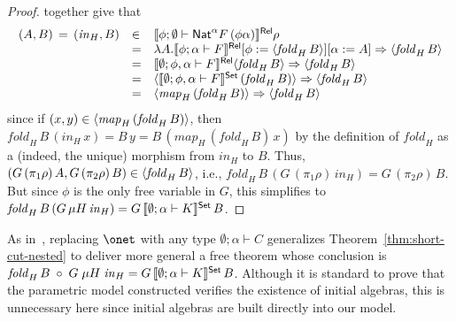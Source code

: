 \documentclass[runningheads]{llncs}
\begin{document}
\begin{proof}
together give that
\[\begin{array}{lll}
(A,B) \,=\, (\mathit{in}_H,B) & \in & \llbracket{\phi;\emptyset\vdash
  \mathsf{Nat}^\alpha F\, (\phi\alpha)}\rrbracket^{\mathsf{Rel}}\rho\\
& = & \lambda A. \llbracket{\phi;\alpha\vdash F}\rrbracket^{\mathsf{Rel}}[\phi :=
  \langle {\mathit{fold}_H\, B} \rangle][\alpha := A] \Rightarrow 
 \langle {\mathit{fold}_H\, B} \rangle \\ 
& = & \llbracket{\emptyset;\phi,\alpha\vdash F}\rrbracket^{\mathsf{Rel}}
  \langle {\mathit{fold}_H\, B} \rangle \Rightarrow \langle {\mathit{fold}_H\,
    B} \rangle\\
  & = & \langle {\llbracket{\emptyset;\phi,\alpha\vdash F}\rrbracket^{\mathsf{Set}}\,(\mathit{fold}_H\,B)} \rangle \Rightarrow \langle {\mathit{fold}_H\, B} \rangle\\
  & = & \langle {\mathit{map}_H \,(\mathit{fold}_H\,B)} \rangle \Rightarrow
\langle {\mathit{fold}_H\, B} \rangle\\
\end{array}\]
since if $(x,y) \in \langle {\mathit{map}_H \,(\mathit{fold}_H\,B)} \rangle$,
then $\mathit{fold}_H\, B\, (\mathit{in}_H\,x) = B\,y = B\,
(\mathit{map}_H \,(\mathit{fold}_H\,B) \, x)$ by the definition of
$\mathit{fold}_H$ as a (indeed, the unique) morphism from
$\mathit{in}_H$ to $B$.  Thus, $(G \,(\pi_1 \rho)\, A, G\, (\pi_2
\rho)\, B) \in \langle {\mathit{fold}_H\, B} \rangle$, i.e., $\mathit{fold}_H \,
B \, (G\, (\pi_1 \rho) \, \mathit{in}_H) = G\,(\pi_2 \rho)\,B$.  But
since $\phi$ is the only free variable in $G$, this simplifies to
$\mathit{fold}_H\, B \, (G\, \mu H\, \mathit{in}_H) =
G\,\llbracket{\emptyset;\alpha\vdash K}\rrbracket^{\mathsf{Set}}\,B$. 
\end{proof}

\vspace*{-0.08in}

As in~\cite{jg10}, replacing $\onet$ with any type $\emptyset;\alpha
\vdash C$ generalizes
Theorem~\ref{thm:short-cut-nested} to deliver more general a free
theorem whose conclusion is $\mathit{fold}_{H}\, B \; \circ \; G\; \mu
H \; \mathit{in}_{H} = G \,\llbracket{\emptyset;\alpha \vdash K}\rrbracket^{\mathsf{Set}}\, B$.
Although it is standard to prove that the parametric model constructed
verifies the existence of initial algebras, this is unnecessary here
since initial algebras are built directly into our model.
\end{document}
